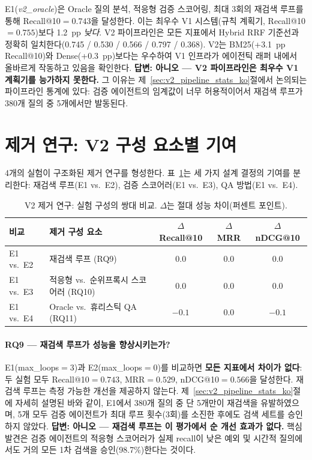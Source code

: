 E1(\textit{v2\_oracle})은 Oracle 질의 분석, 적응형 검증 스코어링, 최대 3회의 재검색 루프를 통해 Recall@10$={0.743}$을 달성한다. 이는 최우수 V1 시스템(규칙 계획기, Recall@10$={0.755}$)보다 1.2~pp \emph{낮다}. V2 파이프라인은 모든 지표에서 Hybrid RRF 기준선과 정확히 일치한다(0.745 / 0.530 / 0.566 / 0.797 / 0.368). V2는 BM25(+3.1~pp Recall@10)와 Dense(+0.3~pp)보다는 우수하여 V1 인프라가 에이전틱 래퍼 내에서 올바르게 작동하고 있음을 확인한다. \textbf{답변: 아니오 --- V2 파이프라인은 최우수 V1 계획기를 능가하지 못한다.} 그 이유는 제~\ref{sec:v2_pipeline_stats_ko}절에서 논의되는 파이프라인 통계에 있다: 검증 에이전트의 임계값이 너무 허용적이어서 재검색 루프가 380개 질의 중 5개에서만 발동된다.


\section{제거 연구: V2 구성 요소별 기여}
\label{sec:v2_ablation_ko}

4개의 실험이 구조화된 제거 연구를 형성한다. 표~\ref{tab:v2_ablation_ko}는 세 가지 설계 결정의 기여를 분리한다: 재검색 루프(E1 vs.\ E2), 검증 스코어러(E1 vs.\ E3), QA 방법(E1 vs.\ E4).

\begin{table}[htbp]
\centering
\caption{V2 제거 연구: 실험 구성의 쌍대 비교. $\Delta$는 절대 성능 차이(퍼센트 포인트).}
\label{tab:v2_ablation_ko}
\begin{tabular}{llccc}
\toprule
\textbf{비교} & \textbf{제거 구성 요소} & \textbf{$\Delta$ Recall@10} & \textbf{$\Delta$ MRR} & \textbf{$\Delta$ nDCG@10} \\
\midrule
E1 vs.\ E2 & 재검색 루프 (RQ9)              & $0.0$ & $0.0$ & $0.0$ \\
E1 vs.\ E3 & 적응형 vs.\ 순위프록시 스코어러 (RQ10) & $0.0$ & $0.0$ & $0.0$ \\
E1 vs.\ E4 & Oracle vs.\ 휴리스틱 QA (RQ11) & $-0.1$ & $0.0$ & $-0.1$ \\
\bottomrule
\end{tabular}
\end{table}

\paragraph{RQ9 --- 재검색 루프가 성능을 향상시키는가?}

E1(max\_loops${=}3$)과 E2(max\_loops${=}0$)를 비교하면 \textbf{모든 지표에서 차이가 없다}: 두 실험 모두 Recall@10$={0.743}$, MRR$={0.529}$, nDCG@10$={0.566}$을 달성한다. 재검색 루프는 측정 가능한 개선을 제공하지 않는다. 제~\ref{sec:v2_pipeline_stats_ko}절에 자세히 설명된 바와 같이, E1에서 380개 질의 중 단 5개만이 재검색을 유발하였으며, 5개 모두 검증 에이전트가 최대 루프 횟수(3회)를 소진한 후에도 검색 세트를 승인하지 않았다. \textbf{답변: 아니오 --- 재검색 루프는 이 평가에서 순 개선 효과가 없다.} 핵심 발견은 검증 에이전트의 적응형 스코어러가 실제 recall이 낮은 예외 및 시간적 질의에서도 거의 모든 1차 검색을 승인(98.7\%)한다는 것이다.

